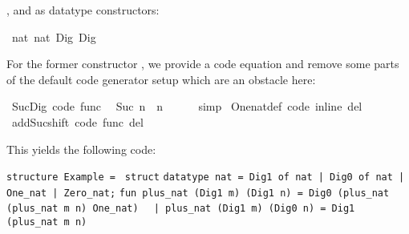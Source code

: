 \begin{isabellebody}
\begin{isamarkuptext}
  ,  and  as
  datatype constructors:%
\end{isamarkuptext}%
\isamarkuptrue%
%
\isadelimquoteme
%
\endisadelimquoteme
%
\isatagquoteme
{}\isamarkupfalse%
\ {\isachardoublequoteopen}{}{\isasymColon}nat{\isachardoublequoteclose}\ {\isachardoublequoteopen}{}{\isasymColon}nat{\isachardoublequoteclose}\ Dig{}\ Dig{}%
\endisatagquoteme
{\isafoldquoteme}%
%
\isadelimquoteme
%
\endisadelimquoteme
%
\begin{isamarkuptext}%
\noindent For the former constructor , we provide a code
  equation and remove some parts of the default code generator setup
  which are an obstacle here:%
\end{isamarkuptext}%
\isamarkuptrue%
%
\isadelimquoteme
%
\endisadelimquoteme
%
\isatagquoteme
{}\isamarkupfalse%
\ Suc{\isacharunderscore}Dig\ {\isacharbrackleft}code\ func{\isacharbrackright}{\isacharcolon}\isanewline
\ \ {\isachardoublequoteopen}Suc\ n\ {\isacharequal}\ n\ {\isacharplus}\ {}{\isachardoublequoteclose}\isanewline
\ \ \isamarkupfalse%
\ simp\isanewline
\isanewline
{}\isamarkupfalse%
\ One{\isacharunderscore}nat{\isacharunderscore}def\ {\isacharbrackleft}code\ inline\ del{\isacharbrackright}\isanewline
{}\isamarkupfalse%
\ add{\isacharunderscore}Suc{\isacharunderscore}shift\ {\isacharbrackleft}code\ func\ del{\isacharbrackright}%
\endisatagquoteme
{\isafoldquoteme}%
%
\isadelimquoteme
%
\endisadelimquoteme
%
\begin{isamarkuptext}%
\noindent This yields the following code:%
\end{isamarkuptext}%
\isamarkuptrue%
%
\isadelimquoteme
%
\endisadelimquoteme
%
\isatagquoteme
%
\begin{isamarkuptext}%
\isaverbatim%
\noindent%
\verb|structure Example = |\newline%
\verb|struct|\newline%
\newline%
\verb|datatype nat = Dig1 of nat |\verb,|,\verb| Dig0 of nat |\verb,|,\verb| One_nat |\verb,|,\verb| Zero_nat;|\newline%
\newline%
\verb|fun plus_nat (Dig1 m) (Dig1 n) = Dig0 (plus_nat (plus_nat m n) One_nat)|\newline%
\verb|  |\verb,|,\verb| plus_nat (Dig1 m) (Dig0 n) = Dig1 (plus_nat m n)|\newline%

\end{isamarkuptext}
\end{isabellebody}
